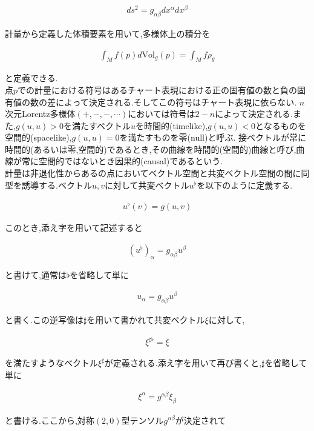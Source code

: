 \documentclass{jsarticle}
\begin{document}
\begin{align}
ds^2=g_{\alpha\beta}dx^\alpha dx^\beta
\end{align}

計量から定義した体積要素を用いて,多様体上の積分を

\begin{align}
\int_M f(p) d\text{Vol}_g(p)= \int_M f \rho_g
\end{align}

と定義できる.\\
点$p$での計量における符号はあるチャート表現における正の固有値の数と負の固有値の数の差によって決定される.そしてこの符号はチャート表現に依らない.
$n$次元Lorentz多様体$(+,-,-,\cdots)$においては符号は$2-n$によって決定される.また,$g(u,u)>0$を満たすベクトル$u$を時間的(timelike),$g(u,u)<0$となるものを空間的(spacelike),$g(u,u)=0$を満たすものを零(null)と呼ぶ.
接ベクトルが常に時間的(あるいは零,空間的)であるとき,その曲線を時間的(空間的)曲線と呼び,曲線が常に空間的ではないとき因果的(causal)であるという.\\

計量は非退化性からあるの点においてベクトル空間と共変ベクトル空間の間に同型を誘導する.ベクトル$u,v$に対して共変ベクトル$u^\flat$を以下のように定義する.

\begin{align}
u^\flat(v)=g(u,v)
\end{align}

このとき,添え字を用いて記述すると

\begin{align}
(u^\flat)_\alpha=g_{\alpha\beta}u^\beta
\end{align}

と書けて,通常は$\flat$を省略して単に

\begin{align}
u_\alpha=g_{\alpha\beta}u^\beta
\end{align}

と書く.この逆写像は$\sharp$を用いて書かれて共変ベクトル$\xi$に対して,

\begin{align}
\xi^{\sharp\flat}=\xi
\end{align}

を満たすようなベクトル$\xi^\sharp$が定義される.添え字を用いて再び書くと,$\sharp$を省略して単に

\begin{align}
\xi^\alpha=g^{\alpha\beta}\xi_\beta
\end{align}

と書ける.ここから,対称$(2,0)$型テンソル$g^{\alpha\beta}$が決定されて
\end{document}
